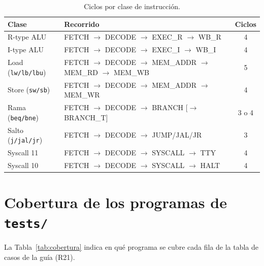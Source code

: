 \documentclass[11pt,a4paper]{article}
\begin{document}
\begin{table}[htbp]
\centering
\caption{Ciclos por clase de instrucción.}
\label{tab:ciclos}
\begin{tabular}{@{}llc@{}}
\toprule
Clase & Recorrido & Ciclos \\
\midrule
R-type ALU & FETCH $\to$ DECODE $\to$ EXEC\_R $\to$ WB\_R & 4 \\
I-type ALU & FETCH $\to$ DECODE $\to$ EXEC\_I $\to$ WB\_I & 4 \\
Load (\texttt{lw/lb/lbu}) & FETCH $\to$ DECODE $\to$ MEM\_ADDR $\to$ MEM\_RD $\to$ MEM\_WB & 5 \\
Store (\texttt{sw/sb}) & FETCH $\to$ DECODE $\to$ MEM\_ADDR $\to$ MEM\_WR & 4 \\
Rama (\texttt{beq/bne}) & FETCH $\to$ DECODE $\to$ BRANCH [$\to$ BRANCH\_T] & 3 o 4 \\
Salto (\texttt{j/jal/jr}) & FETCH $\to$ DECODE $\to$ JUMP/JAL/JR & 3 \\
Syscall 11 & FETCH $\to$ DECODE $\to$ SYSCALL $\to$ TTY & 4 \\
Syscall 10 & FETCH $\to$ DECODE $\to$ SYSCALL $\to$ HALT & 4 \\
\bottomrule
\end{tabular}
\end{table}

\section{Cobertura de los programas de \texttt{tests/}}

La Tabla~\ref{tab:cobertura} indica en qué programa se cubre cada fila de la tabla de casos de la guía (R21).
\end{document}
